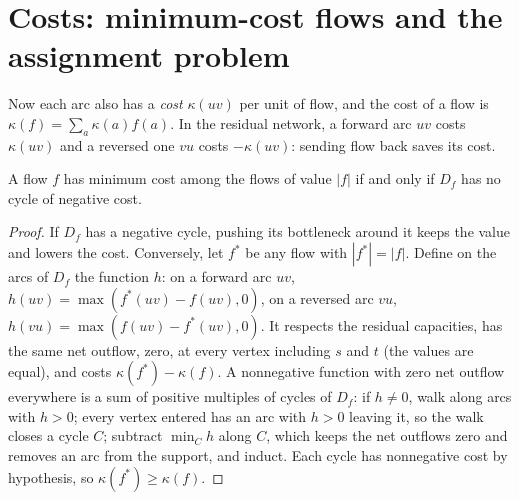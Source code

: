 \section{Costs: minimum-cost flows and the assignment problem}\label{sec:mincost}

Now each arc also has a \emph{cost} $\kappa(uv)$ per unit of flow, and the cost of a flow is $\kappa(f)=\sum_a\kappa(a)f(a)$. In the residual network, a forward arc $uv$ costs $\kappa(uv)$ and a reversed one $vu$ costs $-\kappa(uv)$: sending flow back saves its cost.

\begin{lemma}\label{lem:negcycle}
A flow $f$ has minimum cost among the flows of value $|f|$ if and only if $D_f$ has no cycle of negative cost.
\end{lemma}
\begin{proof}
If $D_f$ has a negative cycle, pushing its bottleneck around it keeps the value and lowers the cost. Conversely, let $f^*$ be any flow with $|f^*|=|f|$. Define on the arcs of $D_f$ the function $h$: on a forward arc $uv$, $h(uv)=\max(f^*(uv)-f(uv),0)$, on a reversed arc $vu$,
$h(vu)=\max(f(uv)-f^*(uv),0)$. It respects the residual capacities, has the same net outflow, zero, at every vertex including $s$ and $t$ (the values are equal), and costs $\kappa(f^*)-\kappa(f)$. A nonnegative function with zero net outflow everywhere is a sum of positive multiples of
cycles of $D_f$: if $h\ne0$, walk along arcs with $h>0$; every vertex entered has an arc with $h>0$ leaving it, so the walk closes a cycle $C$; subtract $\min_Ch$ along $C$, which keeps the
net outflows zero and removes an arc from the support, and induct. Each cycle has nonnegative cost by hypothesis, so $\kappa(f^*)\ge\kappa(f)$.
\end{proof}

